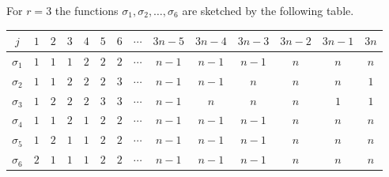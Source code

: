 \begin{exa}\label{exa:sigmaCase3}
For $r = 3$ the functions $\sigma_1, \sigma_2, \ldots, \sigma_6$ are sketched by the following table.
	\begin{center}
	\begin{tabular}{|c||c|c|c|c|c|c|c|c|c|c|c|c|c|}
	\hline 
	$j$ & $1$ & $2$ & $3$ & $4$ & $5$ & $6$ & $\cdots$ & $3n -5$ & $3n - 4$ & $3n-3$ & $3n -2$ & $3n - 1$ & $3n$ \\ 
	\hline \hline
	$\sigma_1$ & \cellcolor{cyan}$1$ & \cellcolor{cyan}$1$ & \cellcolor{cyan}$1$ & \cellcolor{Yellow}$2$ & \cellcolor{Yellow}$2$ & \cellcolor{Yellow}$2$ & $\cdots$ & \cellcolor{YellowGreen}$n-1$ & \cellcolor{YellowGreen}$n-1$ & \cellcolor{YellowGreen}$n-1$ & \cellcolor{YellowOrange}$n$ & \cellcolor{YellowOrange}$n$ & \cellcolor{YellowOrange}$n$ \\
	\hline 
	$\sigma_2$ & \cellcolor{cyan}$1$ & \cellcolor{cyan}$1$ & \cellcolor{Yellow}$2$ & \cellcolor{Yellow}$2$ & \cellcolor{Yellow}$2$ & \cellcolor{Tan!70}$3$ & $\cdots$ & \cellcolor{YellowGreen}$n-1$ & \cellcolor{YellowGreen}$n-1$ & \cellcolor{YellowOrange}$n$ & \cellcolor{YellowOrange}$n$ & \cellcolor{YellowOrange}$n$ & \cellcolor{cyan}$1$ \\ 
	\hline 
	$\sigma_3$ & \cellcolor{cyan}$1$ & \cellcolor{Yellow}$2$ & \cellcolor{Yellow}$2$ & \cellcolor{Yellow}$2$ & \cellcolor{Tan!70}$3$ & \cellcolor{Tan!70}$3$ & $\cdots$ & \cellcolor{YellowGreen}$n-1$ & \cellcolor{YellowOrange}$n$ & \cellcolor{YellowOrange}$n$ & \cellcolor{YellowOrange}$n$ & \cellcolor{cyan}$1$ & \cellcolor{cyan}$1$ \\ 
	\hline \hline
	$\sigma_4$ & \cellcolor{cyan}$1$ & \cellcolor{cyan}$1$ & \cellcolor{Yellow}$2$ & \cellcolor{cyan}$1$ & \cellcolor{Yellow}$2$ & \cellcolor{Yellow}$2$ & $\cdots$ & \cellcolor{YellowGreen}$n-1$ & \cellcolor{YellowGreen}$n-1$ & \cellcolor{YellowGreen}$n-1$ & \cellcolor{YellowOrange}$n$ & \cellcolor{YellowOrange}$n$ & \cellcolor{YellowOrange}$n$ \\  
	\hline 
	$\sigma_5$ & \cellcolor{cyan}$1$ & \cellcolor{Yellow}$2$ & \cellcolor{cyan}$1$ & \cellcolor{cyan}$1$ & \cellcolor{Yellow}$2$ & \cellcolor{Yellow}$2$ & $\cdots$ & \cellcolor{YellowGreen}$n-1$ & \cellcolor{YellowGreen}$n-1$ & \cellcolor{YellowGreen}$n-1$ & \cellcolor{YellowOrange}$n$ & \cellcolor{YellowOrange}$n$ & \cellcolor{YellowOrange}$n$ \\ 
	\hline
	$\sigma_6$ & \cellcolor{Yellow}$2$ & \cellcolor{cyan}$1$ & \cellcolor{cyan}$1$ & \cellcolor{cyan}$1$ & \cellcolor{Yellow}$2$ & \cellcolor{Yellow}$2$ & $\cdots$ & \cellcolor{YellowGreen}$n-1$ & \cellcolor{YellowGreen}$n-1$ & \cellcolor{YellowGreen}$n-1$ & \cellcolor{YellowOrange}$n$ & \cellcolor{YellowOrange}$n$ & \cellcolor{YellowOrange}$n$ \\ 

\end{tabular}
\end{center}
\end{exa}
